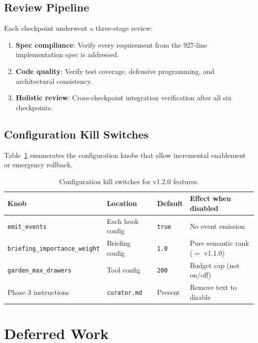 \documentclass[11pt]{article}
\begin{document}
\subsection{Review Pipeline}

Each checkpoint underwent a three-stage review:
\begin{enumerate}[nosep]
    \item \textbf{Spec compliance}: Verify every requirement from the
          927-line implementation spec is addressed.
    \item \textbf{Code quality}: Verify test coverage, defensive
          programming, and architectural consistency.
    \item \textbf{Holistic review}: Cross-checkpoint integration
          verification after all six checkpoints.
\end{enumerate}

\subsection{Configuration Kill Switches}

Table~\ref{tab:killswitches} enumerates the configuration knobs that
allow incremental enablement or emergency rollback.

\begin{table}[H]
\centering
\caption{Configuration kill switches for v1.2.0 features.}
\label{tab:killswitches}
\begin{tabular}{@{}llll@{}}
\toprule
\textbf{Knob} & \textbf{Location} & \textbf{Default} & \textbf{Effect when disabled} \\
\midrule
\texttt{emit\_events}              & Each hook config & \texttt{true} & No event emission \\
\texttt{briefing\_importance\_weight} & Briefing config & \texttt{1.0} & Pure semantic rank ($=$ v1.1.0) \\
\texttt{garden\_max\_drawers}      & Tool config      & \texttt{200}  & Budget cap (not on/off) \\
Phase 3 instructions               & \texttt{curator.md} & Present & Remove text to disable \\
\bottomrule
\end{tabular}
\end{table}

\section{Deferred Work}
\end{document}
